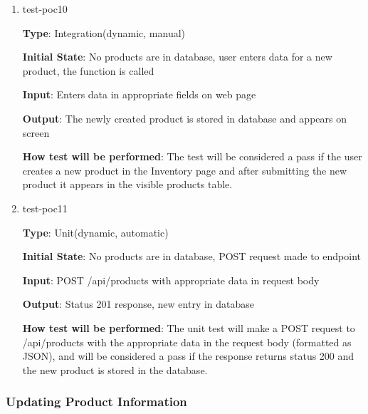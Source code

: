 \documentclass[12pt, titlepage]{article}
\begin{document}
\begin{enumerate}
\item{test-poc10\\}

\textbf{Type}: Integration(dynamic, manual)

\textbf{Initial State}: No products are in database, user enters data for a new product, the function is called

\textbf{Input}: Enters data in appropriate fields on web page

\textbf{Output}: The newly created product is stored in database and appears on screen

\textbf{How test will be performed}: The test will be considered a pass if the user creates a new product in the Inventory page and after submitting the new product it appears in the visible products table.

\item{test-poc11\\}

\textbf{Type}: Unit(dynamic, automatic)

\textbf{Initial State}: No products are in database, POST request made to endpoint

\textbf{Input}: POST /api/products with appropriate data in request body

\textbf{Output}: Status 201 response, new entry in database

\textbf{How test will be performed}: The unit test will make a POST request to /api/products with the appropriate data in the request body (formatted as JSON), and will be considered a pass if the response returns status 200 and the new product is stored in the database.
\end{enumerate}

\subsubsection{Updating Product Information}
\end{document}
